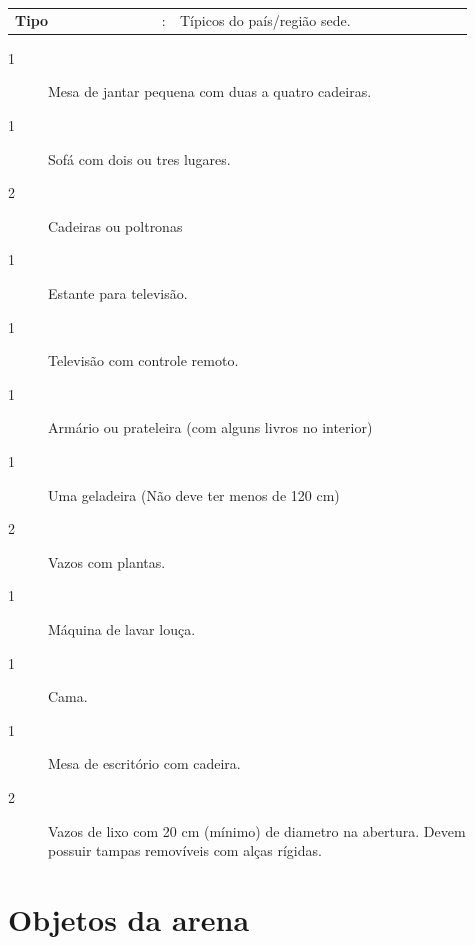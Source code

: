 \documentclass[11pt, twoside, openright, a4paper, chapterprefix]{article}
\begin{document}
\begin{tabular}{ p{0.3\linewidth} p{0.01\linewidth} p{0.6\linewidth}}
    \textbf{Tipo}       & : & Típicos do país/região sede. \\
\end{tabular}

\begin{description}
    \item [1] Mesa de jantar pequena com duas a quatro cadeiras.
    \item [1] Sofá com dois ou tres lugares. 
    \item [2] Cadeiras ou poltronas 
    \item [1] Estante para televisão.
    \item [1] Televisão com controle remoto.
    \item [1] Armário ou prateleira (com alguns livros no interior) 
    \item [1] Uma geladeira (Não deve ter menos de 120 cm)
    \item [2] Vazos com plantas.
    \item [1] Máquina de lavar louça.
    \item [1] Cama.
    \item [1] Mesa de escritório com cadeira.
    \item [2] Vazos de lixo com 20 cm (mínimo) de diametro na abertura. Devem possuir tampas removíveis com alças rígidas.
\end{description}

\section{Objetos da arena}
\end{document}

